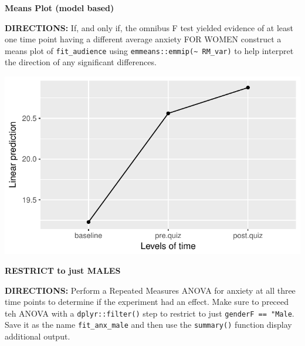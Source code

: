 \documentclass[]{article}
\newenvironment{Shaded}{\begin{snugshade}}{\end{snugshade}}
\newcommand{\KeywordTok}[1]{\textcolor[rgb]{0.13,0.29,0.53}{\textbf{#1}}}
\newcommand{\StringTok}[1]{\textcolor[rgb]{0.31,0.60,0.02}{#1}}
\newcommand{\CommentTok}[1]{\textcolor[rgb]{0.56,0.35,0.01}{\textit{#1}}}
\newcommand{\OperatorTok}[1]{\textcolor[rgb]{0.81,0.36,0.00}{\textbf{#1}}}
\newcommand{\NormalTok}[1]{#1}
\begin{document}
\textbf{Means Plot (model based)}

\textbf{DIRECTIONS:} If, and only if, the omnibus F test yielded
evidence of at least one time point having a different average anxiety
FOR WOMEN construct a means plot of \texttt{fit\_audience} using
\texttt{emmeans::emmip(\textasciitilde{}\ RM\_var)} to help interpret
the direction of any significant differences.

\begin{Shaded}
\end{Shaded}

\begin{center}\includegraphics{Unit_5_assignment_KEY_R__spr18__files/figure-latex/unnamed-chunk-34-1} \end{center}

\clearpage

\textbf{RESTRICT to just MALES}

\textbf{DIRECTIONS:} Perform a Repeated Measures ANOVA for anxiety at
all three time points to determine if the experiment had an effect. Make
sure to preceed teh ANOVA with a \texttt{dplyr::filter()} step to
restrict to just \texttt{genderF\ ==\ "Male}. Save it as the name
\texttt{fit\_anx\_male} and then use the \texttt{summary()} function
display additional output.
\end{document}
